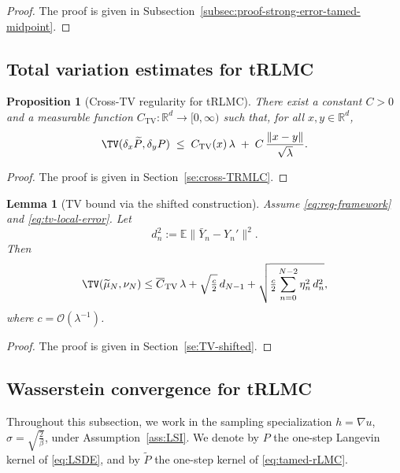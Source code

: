 \documentclass[11pt,a4paper,reqno]{amsart}
\theoremstyle{plain}
\newtheorem{lemma}{Lemma}
\newtheorem{proposition}{Proposition}
\theoremstyle{definition}
\theoremstyle{remark}
\newcommand{\R}{\mathbb{R}}
\newcommand{\E}{\mathbb{E}}
\begin{document}
\begin{proof}
The proof is given in Subsection~\ref{subsec:proof-strong-error-tamed-midpoint}.
\end{proof}



\subsection{Total variation estimates for tRLMC}

\begin{proposition}[Cross-TV regularity for tRLMC]
\label{prop:cross-tv-trlmc}
There exist a constant \(C>0\) and a measurable function
\(C_{\mathrm{TV}}:\R^d\to[0,\infty)\) such that, for all \(x,y\in\R^d\),
\[
  \TV(\delta_x \widetilde P, \delta_y P)
  \;\le\;
  C_{\mathrm{TV}}(x)\,\lambda
  \;+\;
  C\,\frac{\|x-y\|}{\sqrt{\lambda}}.
\]
\end{proposition}

\begin{proof}
The proof is given in Section~\ref{se:cross-TRMLC}.
\end{proof}



\begin{lemma}[TV bound via the shifted construction]
\label{lem:tv-shifted-bound}
Assume \eqref{eq:reg-framework} and \eqref{eq:tv-local-error}. Let
\[
  d_n^2:=\E\|\bar Y_n-Y_n'\|^2.
\]
Then
\begin{equation}\label{eq:tv-shifted-bound}
  \TV(\widetilde\mu_N,\nu_N)
  \le
  \overline C_{\mathrm{TV}}\,\lambda
  +\sqrt{\tfrac{c}{2}}\,d_{N-1}
  +\sqrt{\tfrac{c}{2}\sum_{n=0}^{N-2}\eta_n^2\,d_n^2},
\end{equation}
where \(c=\mathcal{O}(\lambda^{-1})\).
\end{lemma}

\begin{proof}
The proof is given in Section~\ref{se:TV-shifted}.
\end{proof}





\subsection{Wasserstein convergence for tRLMC}

Throughout this subsection, we work in the sampling specialization $h=\nabla u$, $\sigma=\sqrt{\frac{2}{\beta}}$, under Assumption~\ref{ass:LSI}. We denote by \(P\) the one-step Langevin kernel of \eqref{eq:LSDE}, and by \(\widetilde P\) the one-step kernel of \eqref{eq:tamed-rLMC}.
\end{document}
